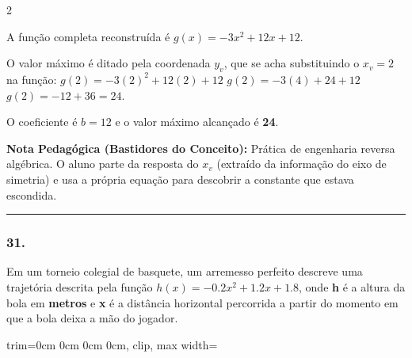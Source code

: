 \begin{multicols*}{2}
\begin{tcolorbox}[colback=CorTitUm!5, colframe=CorTitUm, boxrule=1pt, arc=4pt, left=6pt, right=6pt, top=6pt, bottom=6pt]
    A função completa reconstruída é $g(x) = -3x^2 + 12x + 12$.
    
    O valor máximo é ditado pela coordenada $y_v$, que se acha substituindo o $x_v = 2$ na função:
    $g(2) = -3(2)^2 + 12(2) + 12$
    $g(2) = -3(4) + 24 + 12$
    $g(2) = -12 + 36 = 24$.
    
    O coeficiente é $b = 12$ e o valor máximo alcançado é \textbf{24}.
    \end{tcolorbox}
    \vspace{0.15cm}
    
    \begin{boxexplicacao}
    \textbf{Nota Pedagógica (Bastidores do Conceito):} Prática de engenharia reversa algébrica. O aluno parte da resposta do $x_v$ (extraído da informação do eixo de simetria) e usa a própria equação para descobrir a constante que estava escondida.
    \end{boxexplicacao}
\fi

\par\vspace{\espacoQuestao}
\noindent\textcolor{CorLinha}{\rule{\linewidth}{0.5pt}} 
\par\vspace{\espacoPreQuestao}
\subsubsection*{31.} 
\begin{enunciadoLiteral}
Em um torneio colegial de basquete, um arremesso perfeito descreve uma trajetória descrita pela função $h(x) = -0.2x^2 + 1.2x + 1.8$, onde \textbf{h} é a altura da bola em \textbf{metros} e \textbf{x} é a distância horizontal percorrida a partir do momento em que a bola deixa a mão do jogador.

\begin{center}
\begin{adjustbox}{trim=0cm 0cm 0cm 0cm, clip, max width=\larguraTikz}
\end{adjustbox}
\end{center}
\end{enunciadoLiteral}
\end{multicols*}
